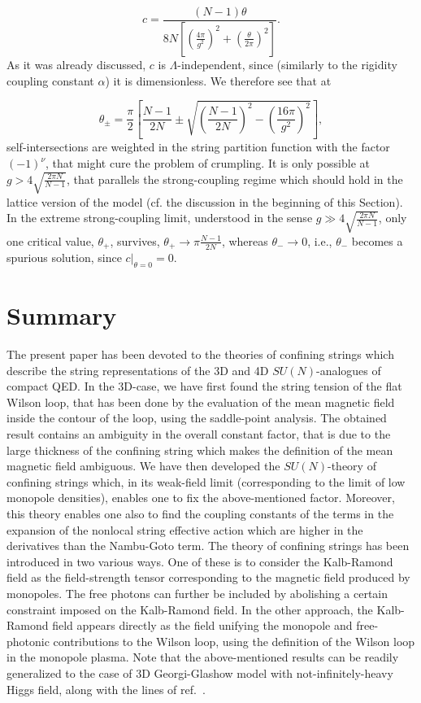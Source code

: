 \documentclass[a4paper,12pt]{article}
\begin{document}
$$c=\frac{(N-1)\theta}{8N\left[
\left(\frac{4\pi}{g^2}\right)^2+\left(\frac{\theta}{2\pi}\right)^2\right]}.$$
As it was already discussed,
$c$ is $\Lambda$-independent, since (similarly to the rigidity coupling constant $\alpha$) it is
dimensionless. We therefore see that at


$$
\theta_{\pm}=\frac{\pi}{2}\left[\frac{N-1}{2N}\pm\sqrt{\left(\frac{N-1}{2N}\right)^2-\left(\frac{16\pi}{g^2}
\right)^2}\right],$$
self-intersections are weighted in the string partition function with the factor $(-1)^\nu$, that might
cure the problem of crumpling. It is only possible at $g>4\sqrt{\frac{2\pi N}{N-1}}$, that parallels the strong-coupling regime which should hold
in the lattice version of the model (cf. the discussion in the beginning of this Section).
In the extreme strong-coupling limit, understood in the sense $g\gg4\sqrt{\frac{2\pi N}{N-1}}$,
only one critical value, $\theta_{+}$, survives, $\theta_{+}\to\pi\frac{N-1}{2N}$, whereas
$\theta_{-}\to 0$, i.e., $\theta_{-}$ becomes a spurious solution, since $\left.c\right|_{\theta=0}=0$.







\section{Summary}
The present paper has been devoted to the theories of confining strings which describe the string representations
of the 3D and 4D $SU(N)$-analogues of compact QED. In the 3D-case, we have first found the string tension of the flat Wilson loop,
that has been done by the evaluation of the mean magnetic field inside the contour of the loop, using the saddle-point analysis.
The obtained result contains an ambiguity in the overall constant factor, that is due to the large thickness of the confining string
which makes the definition of the mean magnetic field ambiguous. We have then developed the $SU(N)$-theory of confining strings
which, in its weak-field limit (corresponding to the limit of low monopole densities), enables one to fix the above-mentioned
factor. Moreover, this theory enables one also to find the coupling constants of the terms in the expansion of the nonlocal string
effective action which are higher in the derivatives than the Nambu-Goto term. The theory of confining strings has been introduced
in two various ways. One of these is to consider the Kalb-Ramond field as the field-strength tensor corresponding to the magnetic field
produced by monopoles. The free photons can further be included by abolishing a certain constraint imposed on the Kalb-Ramond field.
In the other approach, the Kalb-Ramond field appears directly as the field
unifying the monopole and free-photonic contributions to the Wilson loop, using the definition of the Wilson loop in the monopole plasma.
Note that the above-mentioned results can be readily generalized to the case of 3D Georgi-Glashow model with not-infinitely-heavy
Higgs field, along with the lines of ref.~\cite{mpla}.
\end{document}
